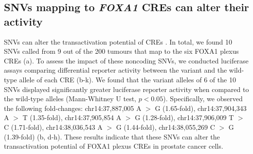 \subsection{SNVs mapping to \emph{FOXA1} CREs can alter their activity}

SNVs can alter the transactivation potential of CREs \cite{baileyNoncodingSomaticInherited2016,rheinbayRecurrentFunctionalRegulatory2017,zhangIntegrativeFunctionalGenomics2012,huangHighlyRecurrentTERT2013,hornTERTPromoterMutations2013,fuxmanbassHumanGeneCenteredTranscription2015,zhouEmergenceNoncodingCancer2016,feiginRecurrentNoncodingRegulatory2017,khuranaRoleNoncodingSequence2016,cowper-sal*lariBreastCancerRisk2012}.
In total, we found 10 SNVs called from 9 out of the 200 tumours that map to the six FOXA1 plexus CREs (a).
To assess the impact of these noncoding SNVs, we conducted luciferase assays comparing differential reporter activity between the variant and the wild-type allele of each CRE (b-k).
We found that the variant alleles of 6 of the 10 SNVs displayed significantly greater luciferase reporter activity when compared to the wild-type alleles (Mann-Whitney U test, $p<0.05$).
Specifically, we observed the following fold-changes: chr14:37,887,005 A $>$ G (1.65-fold), chr14:37,904,343 A $>$ T (1.35-fold), chr14:37,905,854 A $>$ G (1.28-fold), chr14:37,906,009 T $>$ C (1.71-fold), chr14:38,036,543 A $>$ G (1.44-fold), chr14:38,055,269 C $>$ G (1.39-fold) (b, d-h).
These results indicate that these SNVs can alter the transactivation potential of FOXA1 plexus CREs in prostate cancer cells.


